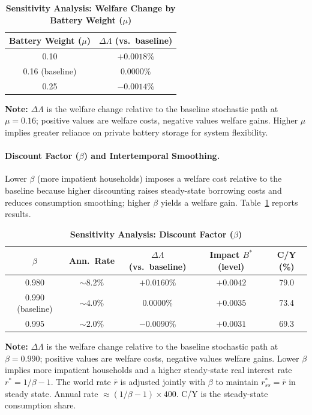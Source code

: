 	\begin{table}[H]
		\centering
		\caption[Sensitivity Analysis: Welfare Change by Battery Weight ($\mu$)]{\textbf{Sensitivity Analysis: Welfare Change by Battery Weight ($\mu$)}}
		\renewcommand{\arraystretch}{1.3}
		\begin{tabular}{c c}
			\toprule
			\textbf{Battery Weight ($\mu$)} & \textbf{$\Delta\Lambda$ (vs.\ baseline)} \\
			\midrule
			0.10 & $+0.0018\%$ \\
			0.16 (baseline) & $0.0000\%$ \\
			0.25 & $-0.0014\%$ \\
			\bottomrule
		\end{tabular}
		\vspace{0.2cm}
		\parbox{\textwidth}{\footnotesize \textbf{Note:} $\Delta\Lambda$ is the welfare change relative to the baseline stochastic path at $\mu = 0.16$; positive values are welfare costs, negative values welfare gains. Higher $\mu$ implies greater reliance on private battery storage for system flexibility.}
	\end{table}

	\paragraph{Discount Factor ($\beta$) and Intertemporal Smoothing.} Lower $\beta$ (more impatient households) imposes a welfare cost relative to the baseline because higher discounting raises steady-state borrowing costs and reduces consumption smoothing; higher $\beta$ yields a welfare gain. Table~\ref{tab:beta_sensitivity} reports results.

	\begin{table}[H]
		\centering
		\caption[Sensitivity Analysis: Discount Factor ($\beta$)]{\textbf{Sensitivity Analysis: Discount Factor ($\beta$)}}
		\label{tab:beta_sensitivity}
		\renewcommand{\arraystretch}{1.3}
		\small
		\begin{tabular}{c c c c c}
			\toprule
			$\beta$ & \textbf{Ann.\ Rate} & \textbf{$\Delta\Lambda$ (vs.\ baseline)} & \textbf{Impact $B^*$ (level)} & \textbf{C/Y (\%)} \\
			\midrule
			0.980 & $\sim 8.2\%$ & $+0.0160\%$ & $+0.0042$ & 79.0 \\
			0.990 (baseline) & $\sim 4.0\%$ & $0.0000\%$ & $+0.0035$ & 73.4 \\
			0.995 & $\sim 2.0\%$ & $-0.0090\%$ & $+0.0031$ & 69.3 \\
			\bottomrule
		\end{tabular}
		\vspace{0.2cm}
		\parbox{\textwidth}{\footnotesize \textbf{Note:} $\Delta\Lambda$ is the welfare change relative to the baseline stochastic path at $\beta = 0.990$; positive values are welfare costs, negative values welfare gains. Lower $\beta$ implies more impatient households and a higher steady-state real interest rate $r^* = 1/\beta - 1$. The world rate $\bar{r}$ is adjusted jointly with $\beta$ to maintain $r^*_{ss} = \bar{r}$ in steady state. Annual rate $\approx (1/\beta - 1) \times 400$. C/Y is the steady-state consumption share.}
	\end{table}

